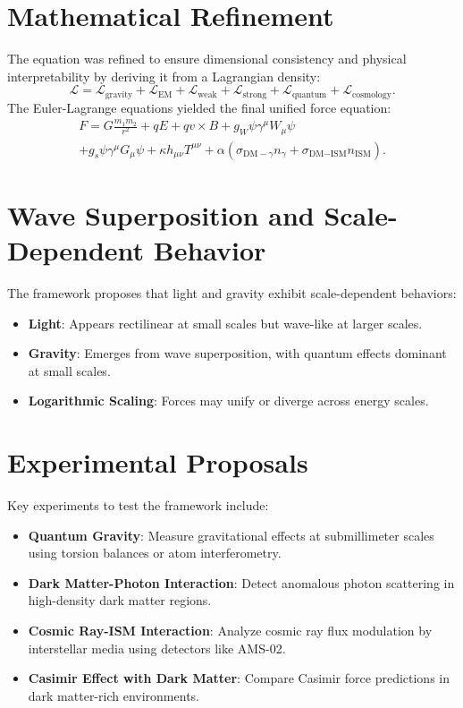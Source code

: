 \documentclass[12pt, a4paper]{article}
\begin{document}
\section{Mathematical Refinement}
The equation was refined to ensure dimensional consistency and physical interpretability by deriving it from a Lagrangian density:
\[
\mathcal{L} = \mathcal{L}_{\text{gravity}} + \mathcal{L}_{\text{EM}} + \mathcal{L}_{\text{weak}} + \mathcal{L}_{\text{strong}} + \mathcal{L}_{\text{quantum}} + \mathcal{L}_{\text{cosmology}}.
\]
The Euler-Lagrange equations yielded the final unified force equation:
\begin{multline*}
F = G\frac{m_1 m_2}{r^2} + qE + qv \times B + g_W \psi \gamma^\mu W_\mu \psi \\
+ g_s \psi \gamma^\mu G_\mu \psi + \kappa h_{\mu\nu} T^{\mu\nu} + \alpha \left( \sigma_{\text{DM}-\gamma} n_{\gamma} + \sigma_{\text{DM}-\text{ISM}} n_{\text{ISM}} \right).
\end{multline*}

\section{Wave Superposition and Scale-Dependent Behavior}
The framework proposes that light and gravity exhibit scale-dependent behaviors:
\begin{itemize}
    \item \textbf{Light}: Appears rectilinear at small scales but wave-like at larger scales.
    \item \textbf{Gravity}: Emerges from wave superposition, with quantum effects dominant at small scales.
    \item \textbf{Logarithmic Scaling}: Forces may unify or diverge across energy scales.
\end{itemize}

\section{Experimental Proposals}
Key experiments to test the framework include:
\begin{itemize}
    \item \textbf{Quantum Gravity}: Measure gravitational effects at submillimeter scales using torsion balances or atom interferometry.
    \item \textbf{Dark Matter-Photon Interaction}: Detect anomalous photon scattering in high-density dark matter regions.
    \item \textbf{Cosmic Ray-ISM Interaction}: Analyze cosmic ray flux modulation by interstellar media using detectors like AMS-02.
    \item \textbf{Casimir Effect with Dark Matter}: Compare Casimir force predictions in dark matter-rich environments.
\end{itemize}
\end{document}
